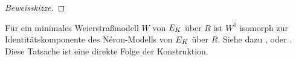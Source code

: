 \begin{Lemma}
\begin{proof}[Beweisskizze]
  \end{proof}
\end{Lemma}

\begin{Bemerkung}
  Für ein minimales Weierstraßmodell $W$ von $E_{K}$ über $R$
  ist $W^0$ isomorph zur Identitätskomponente des Néron-Modells von
  $E_{K}$ über $R$. Siehe dazu \cite[Chapter~1.5, S.\,23]{neron},
  \cite[Corollary~IV.9.1]{silverman2} oder \cite[S.~46]{tate}.
  Diese Tatsache ist eine direkte Folge der Konstruktion.
\end{Bemerkung}


